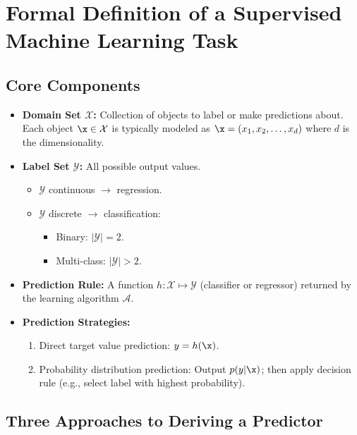 \section*{Formal Definition of a Supervised Machine Learning Task}

\subsection*{Core Components}
\begin{itemize}
    \item \textbf{Domain Set $\mathcal{X}$:} Collection of objects to label or make predictions about. Each object $\x \in \mathcal{X}$ is typically modeled as $\x = (x_1, x_2, \ldots, x_d)$ where $d$ is the \alert{dimensionality}.
    \item \textbf{Label Set $\mathcal{Y}$:} All possible output values.
    \begin{itemize}
        \item $\mathcal{Y}$ continuous $\rightarrow$ \alert{regression}.
        \item $\mathcal{Y}$ discrete $\rightarrow$ \alert{classification}:
        \begin{itemize}
            \item Binary: $|\mathcal{Y}| = 2$.
            \item Multi-class: $|\mathcal{Y}| > 2$.
        \end{itemize}
    \end{itemize}
    \item \textbf{Prediction Rule:} A function $h: \mathcal{X} \mapsto \mathcal{Y}$ (classifier or regressor) returned by the learning algorithm $\mathcal{A}$.
    \item \textbf{Prediction Strategies:}
    \begin{enumerate}
        \item Direct target value prediction: $y = h(\x)$.
        \item Probability distribution prediction: Output $p(y|\x)$; then apply decision rule (e.g., select label with highest probability).
    \end{enumerate}
\end{itemize}

\subsection*{Three Approaches to Deriving a Predictor}

